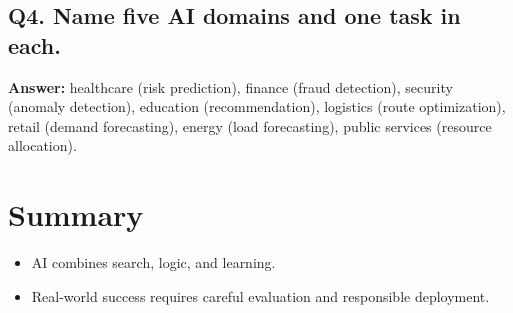 \documentclass[11pt]{article}
\begin{document}
\subsection*{Q4. Name five AI domains and one task in each.}
\textbf{Answer:} healthcare (risk prediction), finance (fraud detection), security (anomaly detection), education (recommendation), logistics (route optimization), retail (demand forecasting), energy (load forecasting), public services (resource allocation).

\section{Summary}
\begin{itemize}[leftmargin=*]
  \item AI combines search, logic, and learning.
  \item Real-world success requires careful evaluation and responsible deployment.
\end{itemize}
\notesources{\AIMLUnitISources}
\end{document}
